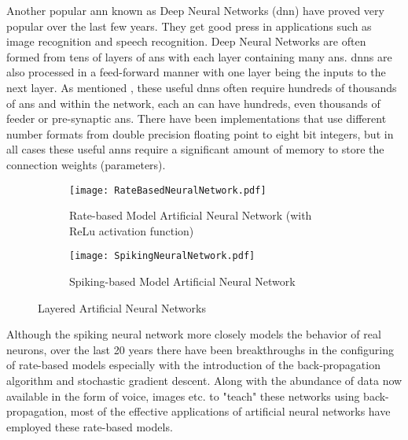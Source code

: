 Another popular \ac{ann} known as Deep Neural Networks (\ac{dnn}) have proved very popular over the last few years. They get good press in applications such as image recognition and speech recognition. 
Deep Neural Networks are often formed from tens of layers of \ac{an}s with each layer containing many \ac{an}s. \ac{dnn}s are also processed in a feed-forward manner with one layer being the inputs to the next layer. 
As mentioned \cite{krizhevsky2012imagenet}, these useful \ac{dnn}s often require hundreds of thousands of \ac{an}s and within the network, each \ac{an} can have hundreds, even thousands of feeder or pre-synaptic \ac{an}s.
There have been implementations that use different number formats from double precision floating point to eight bit integers, but in all cases these useful \ac{ann}s require a significant amount of memory to store the connection weights (parameters).


\begin{figure}[!t]
  \centering
  \captionsetup{justification=centering}
  \captionsetup{width=.9\linewidth}
  \begin{subfigure}{.9\textwidth}
    \centerline{
    \mbox{\texttt{[image: RateBasedNeuralNetwork.pdf]}}
    }
    \caption{Rate-based Model Artificial Neural Network (with ReLu activation function)}
    \label{fig:Rate-based Model Network}
  \end{subfigure}
  
  \begin{subfigure}{.9\textwidth}
    \centerline{
    \mbox{\texttt{[image: SpikingNeuralNetwork.pdf]}}
    }
    \caption{Spiking-based Model Artificial Neural Network}
    \label{fig:Spiking Model Network}
  \end{subfigure}
  \caption{Layered Artificial Neural Networks}
  \label{fig:Layered Artificial Neural Networks}
\end{figure}

Although the spiking neural network more closely models the behavior of real neurons, over the last 20 years there 
have been breakthroughs in the configuring of rate-based models especially with the introduction of the back-propagation
algorithm and stochastic gradient descent. Along with the abundance of data now available in the form of voice, images etc. to "teach" these networks
using back-propagation, most of the effective applications of artificial neural networks have employed these rate-based models.

